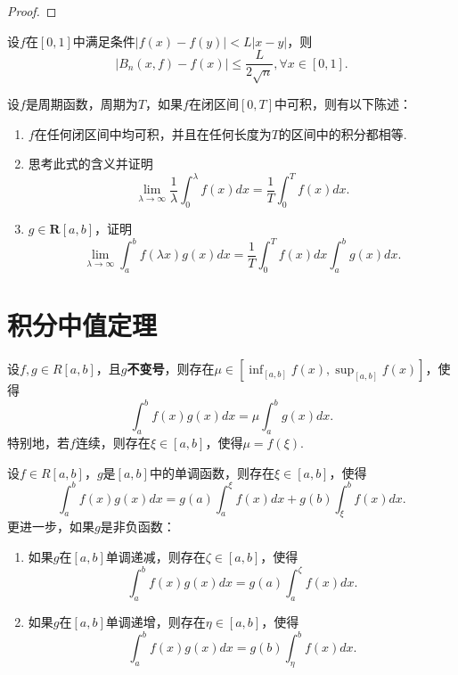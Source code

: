     \begin{proof}
        
    \end{proof}
    \begin{definition}[Bernstein多项式]
        
    \end{definition}
    \begin{example}
        设$f$在$\left[0,1\right]$中满足条件$\left|f(x)-f(y)\right|<L\left|x-y\right|$，则
        $$\left|B_n(x,f)-f(x)\right|\leq\frac{L}{2\sqrt{n}},\forall x\in\left[0,1\right].$$
    \end{example}
    \begin{example}[上一个例子的加强]
        
    \end{example}
    \begin{theorem}[Riemann引理]
        设$f$是周期函数，周期为$T$，如果$f$在闭区间$\left[0,T\right]$中可积，则有以下陈述：
        \begin{enumerate}
            \item $f$在任何闭区间中均可积，并且在任何长度为$T$的区间中的积分都相等.
            \item 思考此式的含义并证明$$\lim\limits_{\lambda\rightarrow\infty}\frac{1}{\lambda}\int_{0}^{\lambda}f(x)dx=\frac{1}{T}\int_{0}^{T}f(x)dx.$$
            \item $g\in\bm{R}\left[a,b\right]$，证明$$\lim\limits_{\lambda\rightarrow\infty}\int_{a}^{b}f(\lambda x)g(x)dx=\frac{1}{T}\int_{0}^{T}f(x)dx\int_{a}^{b}g(x)dx.$$
        \end{enumerate}
    \end{theorem}
    \section{积分中值定理}
    \begin{theorem}[积分第一中值定理]
        设$f,g\in R\left[a,b\right]$，且$g$\textbf{不变号}，则存在$\mu\in\left[\inf_{\left[a,b\right]}f(x),\sup_{\left[a,b\right]}f(x)\right]$，使得$$\int_{a}^{b}f(x)g(x)dx = \mu\int_{a}^{b}g(x)dx.$$
        特别地，若$f$连续，则存在$\xi\in\left[a,b\right]$，使得$\mu=f(\xi)$.
    \end{theorem}
    \begin{theorem}[积分第二中值定理]
        设$f\in R\left[a,b\right]$，$g$是$\left[a,b\right]$中的单调函数，则存在$\xi\in\left[a,b\right]$，使得$$\int_{a}^{b}f(x)g(x)dx = g(a)\int_{a}^{\xi}f(x)dx + g(b)\int_{\xi}^{b}f(x)dx.$$
        更进一步，如果$g$是非负函数：
        \begin{enumerate}
            \item 如果$g$在$\left[a,b\right]$单调递减，则存在$\zeta\in\left[a,b\right]$，使得$$\int_a^bf(x)g(x)dx=g(a)\int_{a}^{\zeta}f(x)dx.$$
            \item 如果$g$在$\left[a,b\right]$单调递增，则存在$\eta\in\left[a,b\right]$，使得$$\int_a^bf(x)g(x)dx=g(b)\int_{\eta}^{b}f(x)dx.$$
        \end{enumerate}
    \end{theorem}
